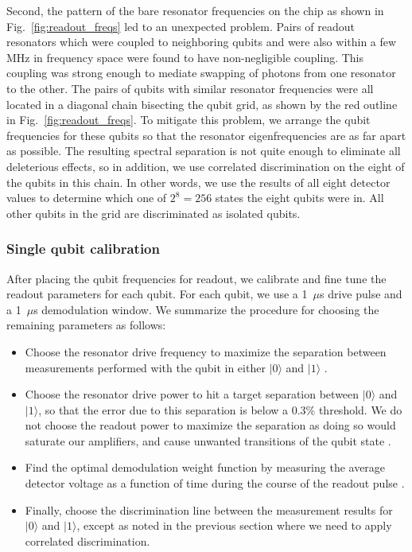 Second, the pattern of the bare resonator frequencies on the chip as shown in Fig.~\ref{fig:readout_freqs} led to an unexpected problem. Pairs of readout resonators which were coupled to neighboring qubits and were also within a few MHz in frequency space were found to have non-negligible coupling. This coupling was strong enough to mediate swapping of photons from one resonator to the other. The pairs of qubits with similar resonator frequencies were all located in a diagonal chain bisecting the qubit grid, as shown by the red outline in Fig.~\ref{fig:readout_freqs}. To mitigate this problem, we arrange the qubit frequencies for these qubits so that the resonator eigenfrequencies are as far apart as possible. The resulting spectral separation is not quite enough to eliminate all deleterious effects, so in addition, we use correlated discrimination on the eight of the qubits in this chain. In other words, we use the results of all eight detector values to determine which one of $2^8 = 256$ states the eight qubits were in. All other qubits in the grid are discriminated as isolated qubits.


\subsubsection{Single qubit calibration}
After placing the qubit frequencies for readout, we calibrate and fine tune the readout parameters for each qubit. For each qubit, we use a 1~$\mu$s drive pulse and a 1~$\mu$s demodulation window. We summarize the procedure for choosing the remaining parameters as follows:
\begin{itemize}
    \item Choose the resonator drive frequency to maximize the separation between measurements performed with the qubit in either $|0\rangle$ and $|1\rangle$ \cite{bultink2018general}.
    \item Choose the resonator drive power to hit a target separation between $|0\rangle$ and $|1\rangle$, so that the error due to this separation is below a 0.3\% threshold. We do not choose the readout power to maximize the separation as doing so would saturate our amplifiers, and cause unwanted transitions of the qubit state \cite{johnson2012heralded, Jeffrey2014Fast, dan_thesis, Sank2016Transitions}.
    \item Find the optimal demodulation weight function by measuring the average detector voltage as a function of time during the course of the readout pulse \cite{bultink2018general, ryan2015tomography}.
    \item Finally, choose the discrimination line between the measurement results for $|0\rangle$ and $|1\rangle$, except as noted in the previous section where we need to apply correlated discrimination.
\end{itemize}


